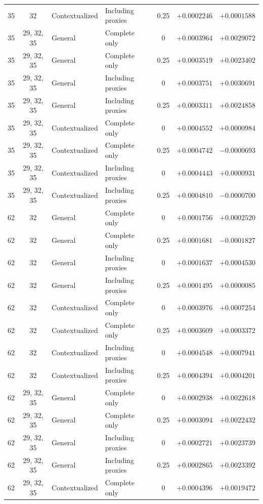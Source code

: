 \begin{table}[p]
\begin{tabular*}{\textwidth}{@{\extracolsep{\fill}}ccllcrr@{}}
35 & 32 & Contextualized & Including proxies & 0.25 & $+0.0002246$ & $+0.0001588$ \\
35 & 29, 32, 35 & General & Complete only & 0 & $+0.0003964$ & $+0.0029072$ \\
35 & 29, 32, 35 & General & Complete only & 0.25 & $+0.0003519$ & $+0.0023402$ \\
35 & 29, 32, 35 & General & Including proxies & 0 & $+0.0003751$ & $+0.0030691$ \\
35 & 29, 32, 35 & General & Including proxies & 0.25 & $+0.0003311$ & $+0.0024858$ \\
35 & 29, 32, 35 & Contextualized & Complete only & 0 & $+0.0004552$ & $+0.0000984$ \\
35 & 29, 32, 35 & Contextualized & Complete only & 0.25 & $+0.0004742$ & $-0.0000693$ \\
35 & 29, 32, 35 & Contextualized & Including proxies & 0 & $+0.0004443$ & $+0.0000931$ \\
35 & 29, 32, 35 & Contextualized & Including proxies & 0.25 & $+0.0004810$ & $-0.0000700$ \\
\midrule
62 & 32 & General & Complete only & 0 & $+0.0001756$ & $+0.0002520$ \\
62 & 32 & General & Complete only & 0.25 & $+0.0001681$ & $-0.0001827$ \\
62 & 32 & General & Including proxies & 0 & $+0.0001637$ & $+0.0004530$ \\
62 & 32 & General & Including proxies & 0.25 & $+0.0001495$ & $+0.0000085$ \\
62 & 32 & Contextualized & Complete only & 0 & $+0.0003976$ & $+0.0007254$ \\
62 & 32 & Contextualized & Complete only & 0.25 & $+0.0003609$ & $+0.0003372$ \\
62 & 32 & Contextualized & Including proxies & 0 & $+0.0004548$ & $+0.0007941$ \\
62 & 32 & Contextualized & Including proxies & 0.25 & $+0.0004394$ & $+0.0004201$ \\
62 & 29, 32, 35 & General & Complete only & 0 & $+0.0002938$ & $+0.0022618$ \\
62 & 29, 32, 35 & General & Complete only & 0.25 & $+0.0003094$ & $+0.0022432$ \\
62 & 29, 32, 35 & General & Including proxies & 0 & $+0.0002721$ & $+0.0023739$ \\
62 & 29, 32, 35 & General & Including proxies & 0.25 & $+0.0002865$ & $+0.0023392$ \\
62 & 29, 32, 35 & Contextualized & Complete only & 0 & $+0.0004396$ & $+0.0019472$ \\

\end{tabular*}
\end{table}
